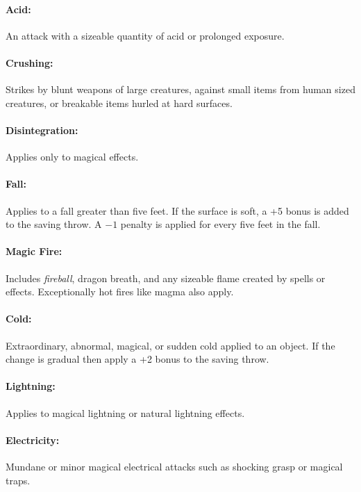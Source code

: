 \begin{multicols}{2}
\paragraph{Acid:} An attack with a sizeable quantity of acid or prolonged exposure.

\paragraph{Crushing:} Strikes by blunt weapons of large creatures, against small items from human sized creatures, or breakable items hurled at hard surfaces.

\paragraph{Disintegration:} Applies only to magical effects.

\paragraph{Fall:} Applies to a fall greater than five feet.  If the surface is soft, a +5 bonus is added to the saving throw.  A $-1$ penalty is applied for every five feet in the fall.

\paragraph{Magic Fire:} Includes \textit{fireball}, dragon breath, and any sizeable flame created by spells or effects.  Exceptionally hot fires like magma also apply.

\paragraph{Cold:} Extraordinary, abnormal, magical, or sudden cold applied to an object.  If the change is gradual then apply a +2 bonus to the saving throw.

\paragraph{Lightning:} Applies to magical lightning or natural lightning effects.

\paragraph{Electricity:} Mundane or minor magical electrical attacks such as shocking grasp or magical traps.


\end{multicols}
